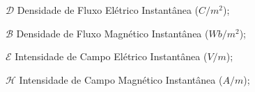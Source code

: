 \begin{simbolos}
	   
\item[$\boldsymbol{\mathcal{D}}$]             Densidade de Fluxo Elétrico Instantânea ($C/m^2$);

\item[$\boldsymbol{\mathcal{B}}$]              Densidade de Fluxo Magnético Instantânea ($Wb/m^2$);

\item[$\boldsymbol{\mathcal{E}}$]             Intensidade de Campo Elétrico Instantânea ($V/m$);

\item[$\boldsymbol{\mathcal{H}}$]              Intensidade de Campo Magnético Instantânea ($A/m$);
	   
\end{simbolos}




